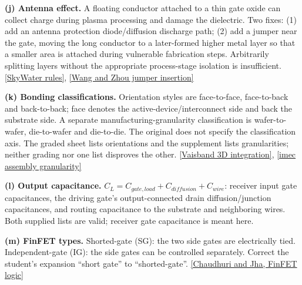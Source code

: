 \documentclass[10pt]{article}
\begin{document}
\textbf{(j) Antenna effect.} A floating conductor attached to a thin gate oxide can collect charge during plasma processing and damage the dielectric. Two fixes: (1) add an antenna protection diode/diffusion discharge path; (2) add a jumper near the gate, moving the long conductor to a later-formed higher metal layer so that a smaller area is attached during vulnerable fabrication steps. Arbitrarily splitting layers without the appropriate process-stage isolation is insufficient. \href{https://skywater-pdk.readthedocs.io/en/main/rules/antenna.html}{[SkyWater rules]}, \href{https://users.ece.northwestern.edu/~haizhou/publications/dac06wang.pdf}{[Wang and Zhou jumper insertion]}

\textbf{(k) Bonding classifications.} Orientation styles are face-to-face, face-to-back and back-to-back; face denotes the active-device/interconnect side and back the substrate side. A separate manufacturing-granularity classification is wafer-to-wafer, die-to-wafer and die-to-die. The original does not specify the classification axis. The graded sheet lists orientations and the supplement lists granularities; neither grading nor one list disproves the other. \href{https://www.hajim.rochester.edu/ece/sites/friedman/Boris_Vaisband_PhD.pdf}{[Vaisband 3D integration]}, \href{https://www.imec-int.com/sites/default/files/2024-06/imec_WP_Monolithic_microsystems_LORES.pdf}{[imec assembly granularity]}

\textbf{(l) Output capacitance.} $C_L=C_{gate,load}+C_{diffusion}+C_{wire}$: receiver input gate capacitances, the driving gate's output-connected drain diffusion/junction capacitances, and routing capacitance to the substrate and neighboring wires. Both supplied lists are valid; receiver gate capacitance is meant here.

\textbf{(m) FinFET types.} Shorted-gate (SG): the two side gates are electrically tied. Independent-gate (IG): the side gates can be controlled separately. Correct the student's expansion ``short gate'' to ``shorted-gate''. \href{https://doi.org/10.1145/2832913}{[Chaudhuri and Jha, FinFET logic]}
\end{document}
